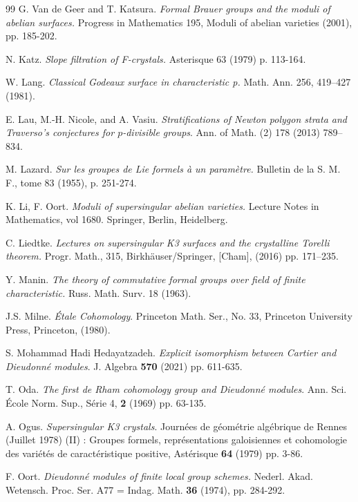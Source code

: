 \documentclass[a4paper,12pt,twoside]{report}
\begin{document}
\begin{thebibliography}{99}
     G. Van de Geer and T. Katsura. \emph{Formal Brauer groups and the moduli of abelian surfaces.}  Progress in Mathematics 195, Moduli of abelian varieties (2001), pp. 185-202.

     N. Katz. \emph{Slope filtration of F-crystals.} Asterisque 63 (1979) p. 113-164. 

     W. Lang. \emph{Classical Godeaux surface in characteristic p. } Math. Ann. 256, 419–427 (1981).

     E. Lau, M.-H. Nicole, and A. Vasiu. \emph{Stratifications of Newton polygon strata and Traverso's conjectures for $p$-divisible groups}. Ann. of Math. (2) 178 (2013) 789--834.  

     M. Lazard. \emph{Sur les groupes de Lie formels à un paramètre.} Bulletin de la S. M. F., tome 83 (1955), p. 251-274. 

     K. Li, F. Oort. \emph{Moduli of supersingular abelian varieties.}  Lecture Notes in Mathematics, vol 1680. Springer, Berlin, Heidelberg.

     C. Liedtke. \emph{Lectures on supersingular K3 surfaces and the crystalline Torelli theorem.} Progr. Math., 315, Birkhäuser/Springer, [Cham], (2016) pp. 171–235.
    
     Y. Manin. \emph{The theory of commutative formal groups over field of finite characteristic.} Russ. Math. Surv. 18 (1963). 

     J.S. Milne. \emph{\'Etale Cohomology}. Princeton Math. Ser., No. 33, Princeton University Press, Princeton, (1980). 

     S. Mohammad Hadi Hedayatzadeh. \emph{Explicit isomorphism between Cartier and Dieudonné modules}. J. Algebra {\bf 570} (2021) pp. 611-635.    

     T. Oda. \emph{The first de Rham cohomology group and Dieudonné modules}. Ann. Sci. École Norm. Sup., Série 4, {\bf 2} (1969) pp. 63-135. 

     A. Ogus. \emph{Supersingular K3 crystals}. Journées de géométrie algébrique de Rennes (Juillet 1978) (II) : Groupes formels, représentations galoisiennes et cohomologie des variétés de caractéristique positive, Astérisque {\bf 64} (1979) pp. 3-86.

     F. Oort. \emph{Dieudonn\'e modules of finite local group schemes.} Nederl. Akad. Wetensch. Proc. Ser. A77 = Indag. Math. {\bf 36} (1974), pp. 284-292.


\end{thebibliography}
\end{document}
